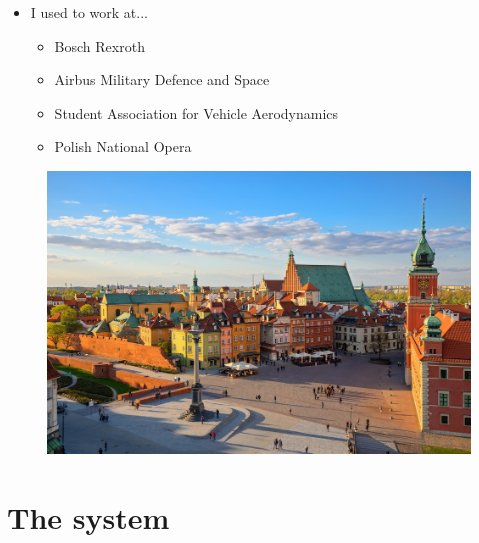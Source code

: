 \documentclass{beamer}
\begin{document}
\begin{frame}
\noindent\begin{minipage}{0.5\textwidth}%
\begin{itemize}
\item I used to work at...
	\begin{itemize}
	\item Bosch Rexroth
	\item Airbus Military Defence and Space
    \item Student Association for Vehicle Aerodynamics
    \item Polish National Opera
	\end{itemize}
\end{itemize}
\end{minipage}%
\hfill%
\begin{minipage}{0.5\textwidth}\raggedleft
\begin{figure}
\includegraphics[scale=0.13]{warsaw2}
\end{figure}
\end{minipage}



\end{frame}

\section{The system}
\end{document}
